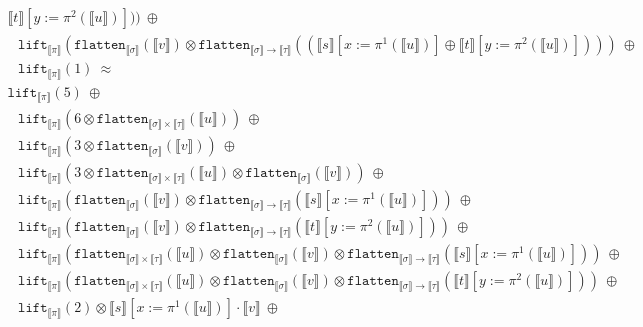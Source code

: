 \documentclass[a4paper,UKenglish,cleveref,autoref,numberwithinsect]{lipics-v2019}
\theoremstyle{definition}
\newcommand{\arrtype}{\rightarrow}
\newcommand{\flatten}{\mathtt{flatten}}
\newcommand{\lift}{\mathtt{lift}}
\newcommand{\typeinterpret}[1]{\llbracket #1 \rrbracket}
\newcommand{\interpret}[1]{\llbracket #1 \rrbracket}
\begin{document}
\begin{itemize}
\[\begin{array}{l}
    \interpret{t}[y:=\pi^2(\interpret{u})]))\ \oplus \\
  \phantom{A}
  \lift_{\typeinterpret{\pi}}(
    \flatten_{\typeinterpret{\sigma}}(\interpret{v}) \otimes
    \flatten_{\typeinterpret{\sigma} \arrtype \typeinterpret{\tau}}(
    (\interpret{s}[x:=\pi^1(\interpret{u})] \oplus
    \interpret{t}[y:=\pi^2(\interpret{u})])))\ \oplus \\
  \phantom{A}
  \lift_{\typeinterpret{\pi}}(1)\ \approx \\
  \lift_{\typeinterpret{\pi}}(5)\ \oplus \\
  \phantom{A}
  \lift_{\typeinterpret{\pi}}(6 \otimes
    \flatten_{\typeinterpret{\sigma} \times \typeinterpret{\tau}}(
    \interpret{u}))\ \oplus \\
  \phantom{A}
  \lift_{\typeinterpret{\pi}}(3 \otimes \flatten_{\typeinterpret{
    \sigma}}(\interpret{v}))\ \oplus \\
  \phantom{A}
  \lift_{\typeinterpret{\pi}}(3 \otimes \flatten_{\typeinterpret{
    \sigma} \times \typeinterpret{\tau}}(\interpret{u}) \otimes
    \flatten_{\typeinterpret{\sigma}}(\interpret{v}))\ \oplus \\
  \phantom{A}
  \lift_{\typeinterpret{\pi}}(
    \flatten_{\typeinterpret{\sigma}}(\interpret{v}) \otimes
    \flatten_{\typeinterpret{\sigma} \arrtype \typeinterpret{\tau}}(
    \interpret{s}[x:=\pi^1(\interpret{u})]))\ \oplus \\
  \phantom{A}
  \lift_{\typeinterpret{\pi}}(
    \flatten_{\typeinterpret{\sigma}}(\interpret{v}) \otimes
    \flatten_{\typeinterpret{\sigma} \arrtype \typeinterpret{
    \tau}}(\interpret{t}[y:=\pi^2(\interpret{u})]))\ \oplus \\
  \phantom{A}
  \lift_{\typeinterpret{\pi}}(\flatten_{\typeinterpret{\sigma} \times
    \typeinterpret{\tau}}(\interpret{u}) \otimes
    \flatten_{\typeinterpret{\sigma}}(\interpret{v}) \otimes
    \flatten_{\typeinterpret{\sigma} \arrtype \typeinterpret{\tau}}(
    \interpret{s}[x:=\pi^1(\interpret{u})]))\ \oplus \\
  \phantom{A}
  \lift_{\typeinterpret{\pi}}(\flatten_{\typeinterpret{\sigma} \times
    \typeinterpret{\tau}}(\interpret{u}) \otimes
    \flatten_{\typeinterpret{\sigma}}(\interpret{v}) \otimes
    \flatten_{\typeinterpret{\sigma} \arrtype \typeinterpret{\tau}}(
    \interpret{t}[y:=\pi^2(\interpret{u})]))\ \oplus \\
  \phantom{A}
  \lift_{\typeinterpret{\pi}}(2) \otimes
    \interpret{s}[x:=\pi^1(\interpret{u})] \cdot \interpret{v}\ \oplus \\

\end{array}\]
\end{itemize}
\end{document}
